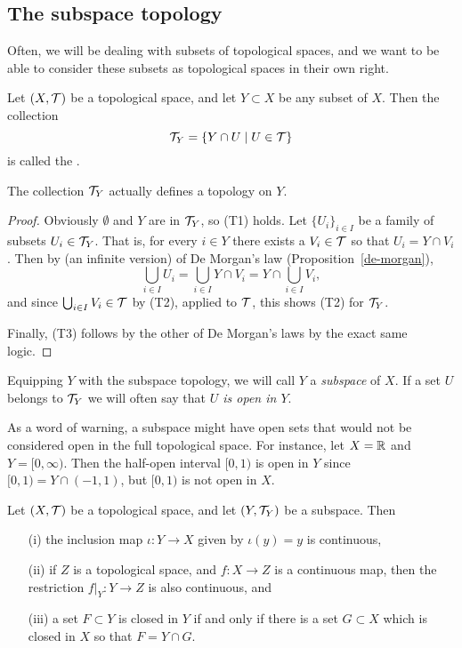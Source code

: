 \subsection{The subspace topology}
Often, we will be dealing with subsets of topological spaces, and we want to be able to consider these subsets as topological spaces in their own right.
\begin{defn}
  Let $(X,\mathcal{T})$ be a topological space, and let $Y \subset X$ be any subset of $X$. Then the collection
  \[
    \mathcal{T}_Y = \{ Y \cap U \mid U \in \mathcal{T} \}
  \]
  is called the .
\end{defn}
\begin{lem}
  The collection $\mathcal{T}_Y$ actually defines a topology on $Y$.
\end{lem}
\begin{proof}
  Obviously $\emptyset$ and $Y$ are in $\mathcal{T}_Y$, so (T1) holds. Let $\{U_i\}_{i\in I}$ be a family of subsets $U_i \in \mathcal{T}_Y$. That is, for every $i \in Y$ there exists a $V_i \in \mathcal{T}$ so that $U_i = Y \cap V_i$. Then by (an infinite version) of De Morgan's law (Proposition~\ref{de-morgan}),
  \[
    \bigcup_{i \in I} U_i = \bigcup_{i \in I} Y \cap V_i = Y \cap \bigcup_{i \in I} V_i,
  \]
  and since $\bigcup_{i \in I} V_i \in \mathcal{T}$ by (T2), applied to $\mathcal{T}$, this shows (T2) for $\mathcal{T}_Y$.
  
  Finally, (T3) follows by the other of De Morgan's laws by the exact same logic.
\end{proof}
Equipping $Y$ with the subspace topology, we will call $Y$ a \emph{subspace} of $X$. If a set $U$ belongs to $\mathcal{T}_Y$ we will often say that \emph{$U$ is open in $Y$}.
\begin{example}
  As a word of warning, a subspace might have open sets that would not be considered open in the full topological space. For instance, let $X = \mathbb{R}$ and $Y = [0,\infty)$. Then the half-open interval $[0,1)$ is open in $Y$ since $[0,1) = Y \cap (-1,1)$, but $[0,1)$ is not open in $X$.
\end{example}
\begin{prop}
  \label{props-subspace-top}
  Let $(X,\mathcal{T})$ be a topological space, and let $(Y,\mathcal{T}_Y)$ be a subspace. Then
  \begin{enumerate}
    \item[(i)] the inclusion map $\iota : Y \to X$ given by $\iota(y) = y$ is continuous,
    \item[(ii)] if $Z$ is a topological space, and $f : X \to Z$ is a continuous map, then the restriction $f|_Y : Y \to Z$ is also continuous, and
    \item[(iii)] a set $F \subset Y$ is closed in $Y$ if and only if there is a set $G \subset X$ which is closed in $X$ so that $F = Y \cap G$.
  \end{enumerate}
\end{prop}
